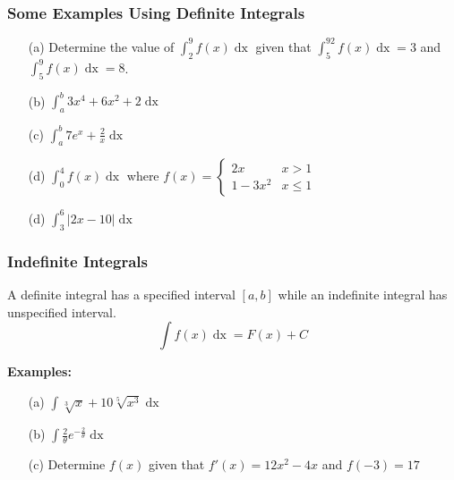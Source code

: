 \documentclass{beamer}
\begin{document}
\begin{frame}
\frametitle{\textbf{Some Examples Using Definite Integrals}}

\begin{itemize}
	\item[(a)] Determine the value of $\int_{2}^{9}f(x) \mathop{dx}$ given that  $\int_{5}^{92}f(x) \mathop{dx} = 3$ and  $\int_{5}^{9}f(x) \mathop{dx} = 8$.
	\item[(b)] $\int_{a}^{b}3x^4 + 6x^2 + 2 \mathop{dx}$
	\item[(c)] $\int_{a}^{b} 7e^x + \frac{2}{x} \mathop{dx}$
	\item[(d)] $\int_{0}^{4} f(x) \mathop{dx}$ where $f(x) = \begin{cases}
	2x & x>1\\ 1-3x^2 & x \leq 1
	\end{cases}$
	\item[(d)] $\int_3^6 |2x-10| \mathop{dx}$
\end{itemize}
\end{frame}

\begin{frame}
\frametitle{\textbf{Indefinite Integrals}}
A definite integral has a specified interval $[a,b]$ while an indefinite integral has unspecified interval.
$$\int f(x) \mathop{dx} = F(x) + C$$

\vspace{6pt}
\textbf{Examples:}
\begin{itemize}
	\item[(a)] $\int \sqrt[3]{x} + 10 \sqrt[5]{x^3} \mathop{dx}$
	\item[(b)] $\int \frac{2}{\theta}e^{-\frac{2}{\theta}} \mathop{dx}$
	\item[(c)] Determine $f(x)$ given that $f'(x) = 12x^2-4x$ and $f(-3)=17$
\end{itemize}
\end{frame}
\end{document}
